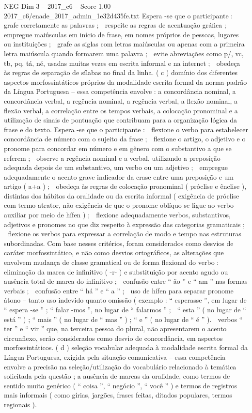 \begin{textsample}{NEG Dim 3 – 2017\_c6 – Score 1.00 – 2017\_c6/enade\_2017\_admin\_1e32d435fe.txt}
Espera -se que o participante :  grafe corretamente as palavras ;  respeite as regras de acentuação gráfica ;  empregue maiúsculas em início de frase, em nomes próprios de pessoas, lugares ou instituições ;  grafe as siglas com letras maiúsculas ou apenas com a primeira letra maiúscula quando formarem uma palavra ;  evite abreviações como p/, vc, tb, pq, tá, né, usadas muitas vezes em escrita informal e na internet ;  obedeça às regras de separação de sílabas no final da linha. ( c ) domínio dos diferentes aspectos morfossintáticos próprios da modalidade escrita formal da norma-padrão da Língua Portuguesa – essa competência envolve : a concordância nominal, a concordância verbal, a regência nominal, a regência verbal, a flexão nominal, a flexão verbal, a correlação entre os tempos verbais, a colocação pronominal e a utilização de sinais de pontuação que contribuam para a organização lógica da frase e do texto.
Espera -se que o participante :  flexione o verbo para estabelecer concordância de número com o sujeito da frase ;  flexione o artigo, o adjetivo e o pronome para concordar em número e em gênero com o substantivo a que se referem ;  observe a regência nominal e a verbal, utilizando a preposição adequada depois de um substantivo, um verbo ou um adjetivo ;  empregue adequadamente o acento grave indicador da crase entre uma preposição e um artigo ( a+a ) ;  obedeça às regras de colocação pronominal ( próclise e ênclise ), distintas dos hábitos da oralidade ou da escrita informal ( exigência de próclise com termo atrator, não exigência de que o pronome oblíquo se ligue ao verbo auxiliar por meio de hífen ) ;  flexione adequadamente verbos, substantivos, adjetivos e pronomes no que diz respeito à expressão das categorias gramaticais ;  flexione os verbos para expressar a correlação de modo e tempo nas estruturas subordinadas.
Com base nesses critérios, foram considerados como desvios de caráter morfossintático, e não como desvios ortográficos, as alterações que envolvem mudança de classe gramatical ou de forma flexional do verbo :  eliminação da marca de infinitivo ( -r- ) e substituição por acento agudo ou ausência total de marca do infinitivo ;  confusão entre “ ão ” e “ am ” nas formas verbais ;  confusão entre “ há ” e “ a ” ;  uso de hífen para separar pronome átono – tanto uso indevido quanto omissão ( exemplo : “ esperasse ”, em lugar de “ espera -se ” ; “ falar -mos ”, no lugar de “ falarmos ” ;  “ esta ” ( no lugar de “ está ” ) ; “ mais ” ( no lugar de “ mas ” ) ; “ e ” ( no lugar de “ é ” ).  verbos “ ter ” e “ vir ” que, na terceira pessoa do plural, não apresentarem o acento circunflexo, serão considerados como desvio de concordância, em aspectos morfossintáticos. ( d ) seleção vocabular adequada à modalidade escrita formal da Língua Portuguesa, exigida pela situação comunicativa – essa competência envolve a precisão na seleção/utilização do vocabulário relacionado à temática solicitada pela questão ; a ausência de marcas da oralidade, como termos de sentido muito genérico ( “ coisa ”, “ negócio ”, “ você ” ) e termos de registros mais informais ( como gírias, jargões, frases feitas, ditados populares, termos regionais ).

\end{textsample}
